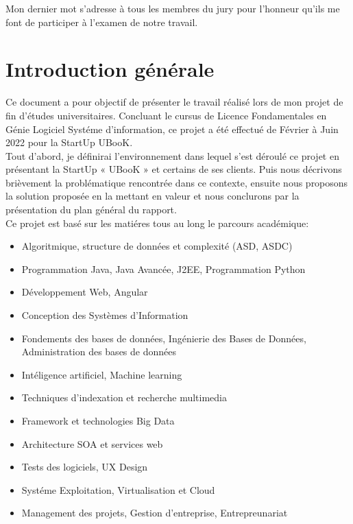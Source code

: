 \documentclass[12pt]{report}
\begin{document}
\begin{center}
{\vspace*{2cm}
Mon dernier mot s’adresse à tous les membres du jury pour l’honneur qu’ils me font de
participer à l’examen de notre travail.
}


\end{center}



\newpage

\tableofcontents
\newpage


\chapter*{Introduction générale}


Ce document a pour objectif de présenter le travail réalisé lors de mon projet de fin d’études
universitaires. Concluant le cursus de Licence Fondamentales en Génie Logiciel Systéme d'information, ce projet a été effectué de Février à Juin 2022 pour la StartUp UBooK.\\
Tout d’abord, je définirai l’environnement dans lequel s’est déroulé ce projet en présentant la
StartUp « UBooK » et certains de ses clients. Puis nous décrivons brièvement la problématique rencontrée dans ce contexte, ensuite nous proposons la solution proposée en la mettant en
valeur et nous conclurons par la présentation du plan général du rapport.\\
Ce projet est basé sur les matiéres tous au long le parcours académique: 
\begin{itemize}
\item Algoritmique, structure de données et complexité (ASD, ASDC)
\item Programmation Java, Java Avancée, J2EE, Programmation Python
\item Développement Web, Angular
\item Conception des Systèmes d'Information   
\item Fondements des bases de données, Ingénierie des Bases de Données, Administration des bases de données
\item Intéligence artificiel, Machine learning 
\item Techniques d'indexation et recherche multimedia
\item Framework et technologies  Big Data
\item Architecture SOA et services web
\item Tests des logiciels, UX Design
\item Systéme Exploitation, Virtualisation et Cloud
\item Management des projets, Gestion d'entreprise, Entrepreunariat
\end{itemize}
\end{document}
